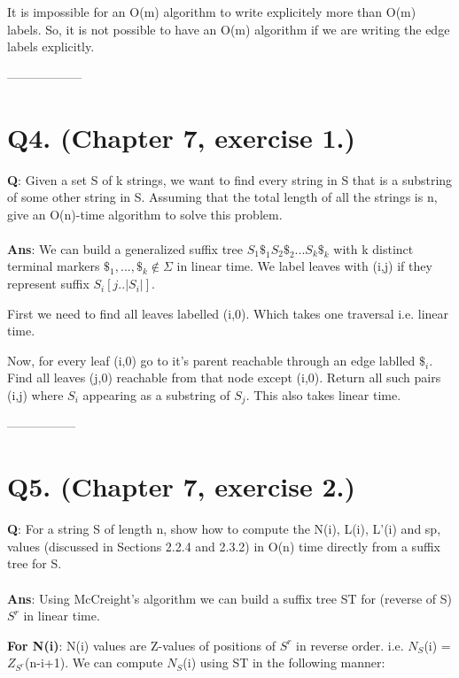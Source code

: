\documentclass[a4paper,11pt]{article}
\begin{document}
It is impossible for an O(m) algorithm to write explicitely more than O(m) labels. So, it is not possible to have an O(m) algorithm if we are writing the edge labels explicitly. 
\begin{center}
 ------------------
\end{center}
\section*{Q4. (Chapter 7, exercise 1.)}
\textbf{Q}: Given a set S of k strings, we want to find every string in S that is a substring of some other string in S. Assuming that the total length of all the strings is n, give an O(n)-time algorithm to solve this problem. 
\\
\\
\textbf{Ans}: We can build a generalized suffix  tree $S_1\$_1S_2\$_2...S_k\$_k$ with k distinct terminal markers $\$_1,...,\$_k \notin \Sigma$ in linear time. We label leaves with (i,j) if they represent suffix $S_i[j..|S_i|]$. 

First we need to find all leaves labelled (i,0). Which takes one traversal i.e. linear time.

Now, for every leaf (i,0) go to it's parent reachable through an edge lablled $\$_i$. Find all leaves (j,0)  reachable from that node except (i,0). Return all such pairs (i,j) where $S_i$ appearing as a substring of $S_j$. This also takes linear time.



\begin{center}
-----------------\\
\end{center}

\section*{Q5. (Chapter 7, exercise 2.)}
\textbf{Q}: For a string S of length n, show how to compute the N(i), L(i), L'(i) and sp, values (discussed in Sections 2.2.4 and 2.3.2) in O(n) time directly from a suffix tree for S.
\\
\\
 \textbf{Ans}:  Using McCreight’s algorithm  we can build a suffix tree ST for (reverse of S) $S^r$ in linear time.
 
 \textbf{For N(i)}:
 N(i) values are Z-values of positions of $S^r$ in reverse order. i.e. $N_S$(i) = $Z_{S^r}$(n-i+1).
 We can compute $N_S$(i) using ST in the following manner:
\end{document}
